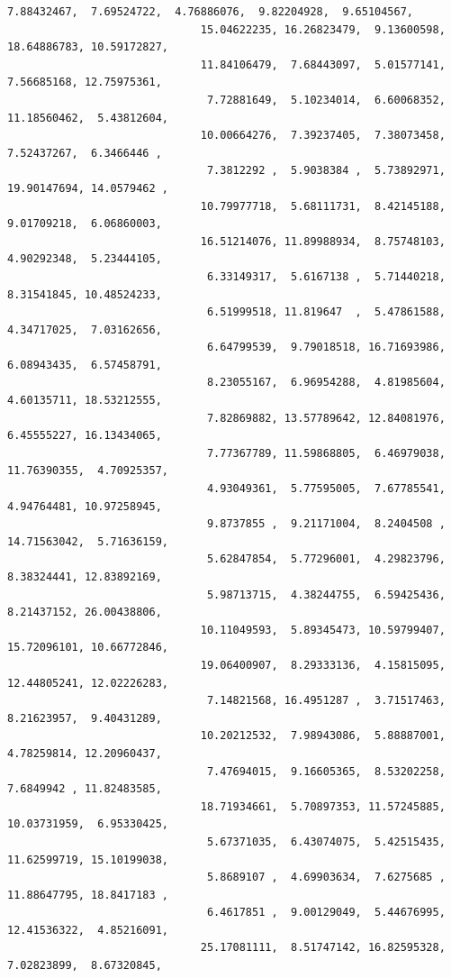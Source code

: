 \documentclass[11pt]{article}
\begin{document}
\begin{Verbatim}[commandchars=\\\{\}]
                               7.88432467,  7.69524722,  4.76886076,  9.82204928,  9.65104567,
                              15.04622235, 16.26823479,  9.13600598, 18.64886783, 10.59172827,
                              11.84106479,  7.68443097,  5.01577141,  7.56685168, 12.75975361,
                               7.72881649,  5.10234014,  6.60068352, 11.18560462,  5.43812604,
                              10.00664276,  7.39237405,  7.38073458,  7.52437267,  6.3466446 ,
                               7.3812292 ,  5.9038384 ,  5.73892971, 19.90147694, 14.0579462 ,
                              10.79977718,  5.68111731,  8.42145188,  9.01709218,  6.06860003,
                              16.51214076, 11.89988934,  8.75748103,  4.90292348,  5.23444105,
                               6.33149317,  5.6167138 ,  5.71440218,  8.31541845, 10.48524233,
                               6.51999518, 11.819647  ,  5.47861588,  4.34717025,  7.03162656,
                               6.64799539,  9.79018518, 16.71693986,  6.08943435,  6.57458791,
                               8.23055167,  6.96954288,  4.81985604,  4.60135711, 18.53212555,
                               7.82869882, 13.57789642, 12.84081976,  6.45555227, 16.13434065,
                               7.77367789, 11.59868805,  6.46979038, 11.76390355,  4.70925357,
                               4.93049361,  5.77595005,  7.67785541,  4.94764481, 10.97258945,
                               9.8737855 ,  9.21171004,  8.2404508 , 14.71563042,  5.71636159,
                               5.62847854,  5.77296001,  4.29823796,  8.38324441, 12.83892169,
                               5.98713715,  4.38244755,  6.59425436,  8.21437152, 26.00438806,
                              10.11049593,  5.89345473, 10.59799407, 15.72096101, 10.66772846,
                              19.06400907,  8.29333136,  4.15815095, 12.44805241, 12.02226283,
                               7.14821568, 16.4951287 ,  3.71517463,  8.21623957,  9.40431289,
                              10.20212532,  7.98943086,  5.88887001,  4.78259814, 12.20960437,
                               7.47694015,  9.16605365,  8.53202258,  7.6849942 , 11.82483585,
                              18.71934661,  5.70897353, 11.57245885, 10.03731959,  6.95330425,
                               5.67371035,  6.43074075,  5.42515435, 11.62599719, 15.10199038,
                               5.8689107 ,  4.69903634,  7.6275685 , 11.88647795, 18.8417183 ,
                               6.4617851 ,  9.00129049,  5.44676995, 12.41536322,  4.85216091,
                              25.17081111,  8.51747142, 16.82595328,  7.02823899,  8.67320845,

\end{Verbatim}
\end{document}
